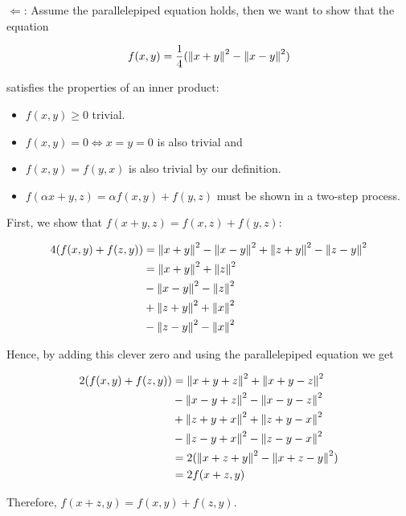 \(\Leftarrow\): Assume the parallelepiped equation holds, then we want to show that the equation 

\[
    f(x, y) = \frac{1}{4} (\left\| x + y \right\|^2 - \left\| x - y \right\|^2)
\]

satisfies the properties of an inner product:

\begin{itemize}

    \item \(f(x,y) \ge 0\) trivial. 

    \item \(f(x,y) = 0 \iff x = y = 0\) is also trivial and

    \item \(f(x, y) = f(y,x)\) is also trivial by our definition.

    \item \(f(\alpha x + y, z) = \alpha f(x, y) + f(y, z)\) must be shown in a two-step process.

\end{itemize}

First, we show that \(f(x + y, z) = f(x,z) + f(y,z)\):

\begin{align*}
    4(f(x,y) + f(z, y)) &= \left\| x + y \right\|^2 - \left\| x - y \right\|^2 + \left\| z + y \right\|^2 - \left\| z - y \right\|^2 \\ 
    &= \left\| x + y \right\|^2 +\left\| z \right\|^2 \\ 
    &- \left\| x - y \right\|^2 - \left\| z \right\|^2  \\ 
    &+ \left\| z + y \right\|^2 + \left\| x \right\|^2 \\ 
    &- \left\| z - y \right\|^2 - \left\| x \right\|^2 
\end{align*}

Hence, by adding this clever zero and using the parallelepiped equation we get

\begin{align*}
    2(f(x, y) + f(z, y)) &= \left\| x + y + z \right\|^2 + \left\| x + y - z \right\|^2 \\
    &- \left\| x - y + z \right\|^2 - \left\| x - y - z \right\|^2 \\
    &+ \left\| z + y + x \right\|^2 + \left\| z + y - x \right\|^2 \\
    & - \left\| z - y + x \right\|^2 - \left\| z - y - x \right\|^2 \\
    &= 2(\left\| x + z + y \right\|^2 - \left\| x + z - y \right\|^2) \\
    &= 2f(x + z, y)
\end{align*}

Therefore, \(f(x + z, y) = f(x,y) + f(z, y)\).

